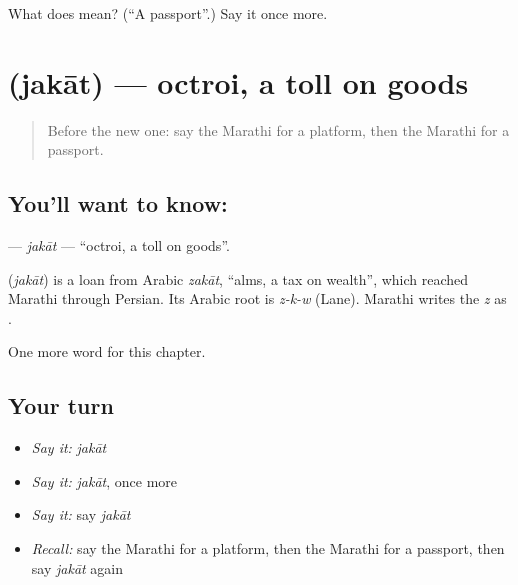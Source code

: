 \begin{tcolorbox}[breakable,colback=teal!4,colframe=teal!35!black,title={Before you move on}]
What does  mean? (\textquotedblleft{}A passport\textquotedblright{}.) Say it once more.
\end{tcolorbox}
\section[\texorpdfstring{\mr{जकात} (jakāt)}{जकात (jakāt)}]{ (jakāt) — octroi, a toll on goods}

\label{lesson:MR-C236-jakat}



\begin{quote}
Before the new one: say the Marathi for a platform, then the Marathi for a passport.
\end{quote}

\subsection*{You'll want to know: }
\textbf{} — \emph{jakāt} — \textquotedblleft{}octroi, a toll on goods\textquotedblright{}.

\begin{cousinweb}
\textbf{} (\emph{jakāt}) is a loan from Arabic \emph{zakāt}, \textquotedblleft{}alms, a tax on wealth\textquotedblright{}, which reached Marathi through Persian. Its Arabic root is \emph{z-k-w} (Lane). Marathi writes the \emph{z} as \textbf{}.
\end{cousinweb}

\begin{grammarlens}[title={What you've built}]
One more word for this chapter.
\end{grammarlens}

\subsection*{Your turn}
\begin{itemize}
\raggedright
  \item \emph{Say it:} \emph{jakāt}
  \item \emph{Say it:} \emph{jakāt}, once more
  \item \emph{Say it:} say \emph{jakāt}
  \item \emph{Recall:} say the Marathi for a platform, then the Marathi for a passport, then say \emph{jakāt} again
\end{itemize}

